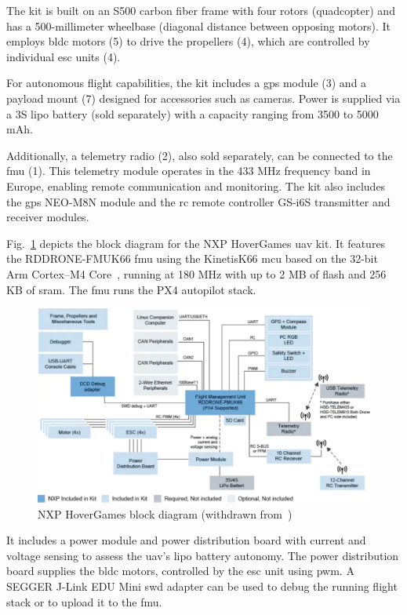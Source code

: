 The kit is built on an S500 carbon fiber frame with four rotors (quadcopter) and has a 500-millimeter wheelbase (diagonal distance between opposing motors). It employs \gls{bldc} motors (5) to drive the propellers (4), which are controlled by individual \gls{esc} units (4).

For autonomous flight capabilities, the kit includes a \gls{gps} module (3) and a payload mount (7) designed for accessories such as cameras. Power is supplied via a 3S \gls{lipo} battery (sold separately) with a capacity ranging from 3500 to 5000 mAh.

Additionally, a telemetry radio (2), also sold separately, can be connected to
the \gls{fmu} (1). This telemetry module operates in the 433 MHz frequency band
in Europe, enabling remote communication and monitoring.
%
The kit also includes the \gls{gps} NEO-M8N module and the \gls{rc} remote
controller GS-i6S transmitter and receiver modules.

Fig.~\ref{fig:hoverGames-blkDiag} depicts the block diagram for the NXP
HoverGames \gls{uav} kit.  It features the RDDRONE-FMUK66 \gls{fmu} using the
Kinetis\textreg K66 \gls{mcu} based on the 32-bit Arm\textreg
Cortex\textreg--M4 Core~\cite{nxp-hoverGames-fmu}, running at 180 MHz
with up to 2 MB of flash and 256 KB of \gls{sram}. The \gls{fmu} runs the PX4
autopilot stack.

\begin{figure}[!hbt]
  \centering
  \includegraphics[width=1.0\textwidth]{./img/pdf/hoverGames-blkDiag.pdf} 
  \caption[NXP HoverGames block diagram]{NXP HoverGames block diagram (withdrawn from~\cite{nxp-hoverGames-uav})\footnotemark}%
  \label{fig:hoverGames-blkDiag}
\end{figure}
%

It includes a power module and power distribution
board with current and voltage sensing to assess the \gls{uav}'s \gls{lipo}
battery autonomy. The power distribution board supplies the \gls{bldc} motors,
controlled by the \gls{esc} unit using \gls{pwm}. A SEGGER J-Link EDU Mini \gls{swd} adapter can
be used to debug the running flight stack or to upload it to the \gls{fmu}. 

